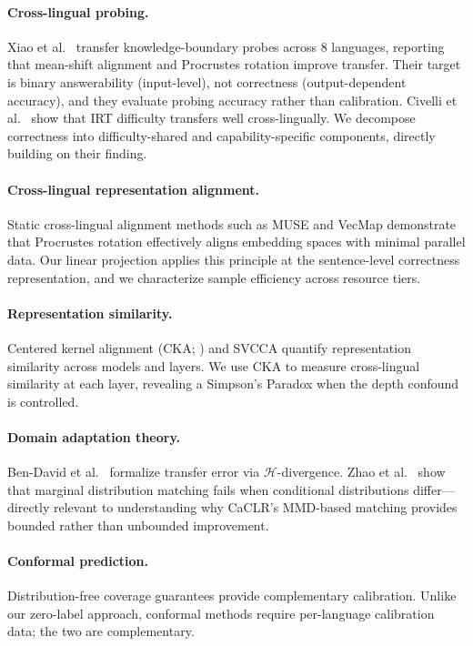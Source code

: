\documentclass[11pt,a4paper]{article}
\begin{document}
\paragraph{Cross-lingual probing.}
Xiao et al.\ \cite{xiao2025crosslingual} transfer knowledge-boundary probes across 8 languages, reporting that mean-shift alignment and Procrustes rotation improve transfer. Their target is binary answerability (input-level), not correctness (output-dependent accuracy), and they evaluate probing accuracy rather than calibration. Civelli et al.\ \cite{civelli2024crosslingual} show that IRT difficulty transfers well cross-lingually. We decompose correctness into difficulty-shared and capability-specific components, directly building on their finding.

\paragraph{Cross-lingual representation alignment.}
Static cross-lingual alignment methods such as MUSE \cite{conneau2018word} and VecMap \cite{artetxe2018robust} demonstrate that Procrustes rotation effectively aligns embedding spaces with minimal parallel data. Our linear projection applies this principle at the sentence-level correctness representation, and we characterize sample efficiency across resource tiers.

\paragraph{Representation similarity.}
Centered kernel alignment (CKA; \cite{kornblith2019similarity}) and SVCCA \cite{raghu2017svcca} quantify representation similarity across models and layers. We use CKA to measure cross-lingual similarity at each layer, revealing a Simpson's Paradox when the depth confound is controlled.

\paragraph{Domain adaptation theory.}
Ben-David et al.\ \cite{bendavid2010theory} formalize transfer error via $\mathcal{H}$-divergence. Zhao et al.\ \cite{zhao2019learning} show that marginal distribution matching fails when conditional distributions differ---directly relevant to understanding why CaCLR's MMD-based matching provides bounded rather than unbounded improvement.

\paragraph{Conformal prediction.}
Distribution-free coverage guarantees \cite{angelopoulos2023conformal} provide complementary calibration. Unlike our zero-label approach, conformal methods require per-language calibration data; the two are complementary.
\end{document}
